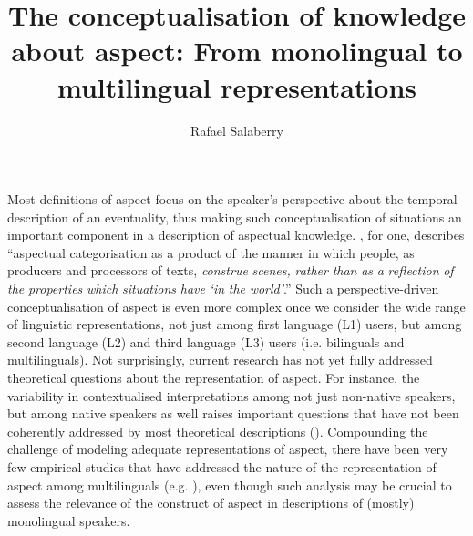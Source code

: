 \documentclass[output=paper,modfonts,nonflat,newtxmath]{langsci/langscibook}
\author{Rafael Salaberry \affiliation{Rice University}}
\title{The {conceptualisation} {of} {knowledge} {about} {aspect:} {From} {monolingual} {to} {multilingual} {representations} }
\begin{document}
\maketitle



Most definitions of aspect focus on the speaker’s perspective about the temporal description of an eventuality, thus making such conceptualisation of situations an important component in a description of aspectual knowledge. \citet[5, italics added]{Michaelis1998}, for one, describes “aspectual categorisation as a product of the manner in which people, as producers and processors of texts, \textit{construe} \textit{scenes,} \textit{rather} \textit{than} \textit{as} \textit{a} \textit{reflection} \textit{of} \textit{the} \textit{properties} \textit{which} \textit{situations} \textit{have} \textit{‘in} \textit{the} \textit{world’}.” Such a perspective-driven conceptualisation of aspect is even more complex once we consider the wide range of linguistic representations, not just among first language (L1) users, but among second language (L2) and third language (L3) users (i.e. bilinguals and multilinguals). Not surprisingly, current research has not yet fully addressed theoretical questions about the representation of aspect. For instance, the variability in contextualised interpretations among not just non-native speakers, but among native speakers as well raises important questions that have not been coherently addressed by most theoretical descriptions (\citealt{Salaberry2008, Ziegeler2008, Sasse2012}). Compounding the challenge of modeling adequate representations of aspect, there have been very few empirical studies that have addressed the nature of the representation of aspect among multilinguals (e.g. \citealt{Salaberry2005, Foote2009, DiaubalickGuijarro-Fuentes2016}), even though such analysis may be crucial to assess the relevance of the construct of aspect in descriptions of (mostly) monolingual speakers.
\end{document}

